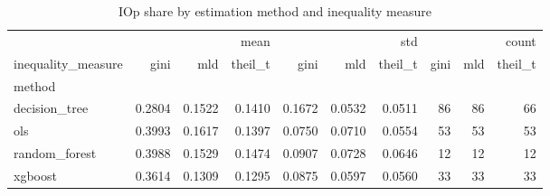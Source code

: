 \begin{table}
\caption{IOp share by estimation method and inequality measure}
\label{tab:method_measure}
\begin{tabular}{lrrrrrrrrr}
\toprule
 & \multicolumn{3}{r}{mean} & \multicolumn{3}{r}{std} & \multicolumn{3}{r}{count} \\
inequality_measure & gini & mld & theil_t & gini & mld & theil_t & gini & mld & theil_t \\
method &  &  &  &  &  &  &  &  &  \\
\midrule
decision_tree & 0.2804 & 0.1522 & 0.1410 & 0.1672 & 0.0532 & 0.0511 & 86 & 86 & 66 \\
ols & 0.3993 & 0.1617 & 0.1397 & 0.0750 & 0.0710 & 0.0554 & 53 & 53 & 53 \\
random_forest & 0.3988 & 0.1529 & 0.1474 & 0.0907 & 0.0728 & 0.0646 & 12 & 12 & 12 \\
xgboost & 0.3614 & 0.1309 & 0.1295 & 0.0875 & 0.0597 & 0.0560 & 33 & 33 & 33 \\
\bottomrule
\end{tabular}
\end{table}
